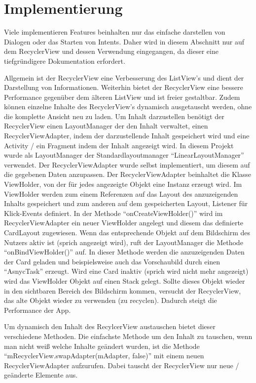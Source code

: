 
\chapter{Implementierung}

Viele implementieren Features beinhalten nur das einfache darstellen von Dialogen oder das Starten von Intents. Daher wird in diesem Abschnitt nur auf dem RecyclerView und dessen Verwendung eingegangen, da dieser eine tiefgründigere Dokumentation erfordert. 

Allgemein ist der RecyclerView eine Verbesserung des ListView's und dient der Darstellung von Informationen. Weiterhin bietet der RecyclerView eine bessere Performance gegenüber dem älteren ListView und ist freier gestaltbar. Zudem können einzelne Inhalte des RecyclerView's dynamisch ausgetauscht werden, ohne die komplette Ansicht neu zu laden. Um Inhalt darzustellen benötigt der RecyclerView  einen LayoutManager der den Inhalt verwaltet, einen RecyclerViewAdapter, indem der darzustellende Inhalt gespeichert wird und eine Activity / ein Fragment indem der Inhalt angezeigt wird. In diesem Projekt wurde als LayoutManager der Standardlayoutmanager \enquote{LinearLayoutManager} verwendet. Der RecyclerViewAdapter wurde selbst implementiert, um diesem auf die gegebenen Daten anzupassen. Der RecyclerViewAdapter beinhaltet die Klasse ViewHolder, von der für jedes angezeigte Objekt eine Instanz erzeugt wird. Im ViewHolder werden zum einem Referenzen auf das Layout des anzuzeigenden Inhalts gespeichert und zum anderen auf dem gespeicherten Layout, Listener für Klick-Events definiert. In der Methode \enquote{onCreateViewHolder()} wird im RecyclerViewAdapter ein neuer ViewHolder angelegt und diesem das definierte CardLayout zugewiesen. Wenn das entsprechende Objekt auf dem Bildschirm des Nutzers aktiv ist (sprich angezeigt wird), ruft der LayoutManager die Methode \enquote{onBindViewHolder()} auf. In dieser Methode werden die anzuzeigenden Daten der Card geladen und beispielsweise auch das Vorschaubild durch einen \enquote{AsnycTask} erzeugt. Wird eine Card inaktiv (sprich wird nicht mehr angezeigt) wird das ViewHolder Objekt auf einen Stack gelegt. Sollte dieses Objekt wieder in den sichtbaren Bereich des Bildschirm kommen, versucht der RecyclerView, das alte Objekt wieder zu verwenden (zu recyclen). Dadurch steigt die Performance der App. 

Um dynamisch den Inhalt des RecylcerView austauschen bietet dieser verschiedene Methoden. Die einfachste Methode um den Inhalt zu tauschen, wenn man nicht weiß welche Inhalte geändert wurden, ist die Methode \enquote{mRecyclerView.swapAdapter(mAdapter, false)} mit einem neuen RecyclerViewAdapter aufzurufen. Dabei tauscht der RecyclerView nur neue / geänderte Elemente aus.

